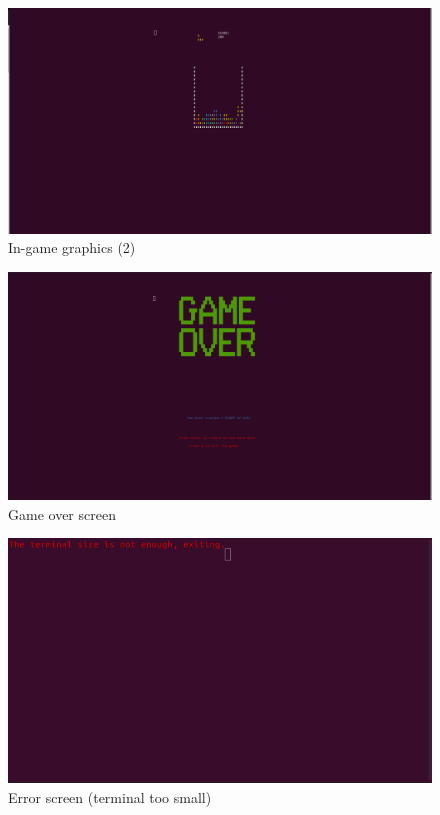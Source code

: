 \documentclass{article}
\begin{document}
\begin{figure}[H]
    \centering
    \includegraphics[width=\linewidth]{img/in_game/Tetris_mid_game.png}
    \caption{In-game graphics (2)}
    \label{fig:mid_game}
\end{figure}

\begin{figure}[H]
    \centering
    \includegraphics[width=\linewidth]{img/in_game/Tetris_game_over.png}
    \caption{Game over screen}
    \label{fig:game_over}
\end{figure}

\begin{figure}[H]
    \centering
    \includegraphics[width=\linewidth]{img/in_game/Tetris_error.png}
    \caption{Error screen (terminal too small)}
    \label{fig:termial_size_error}
\end{figure}



\end{document}
